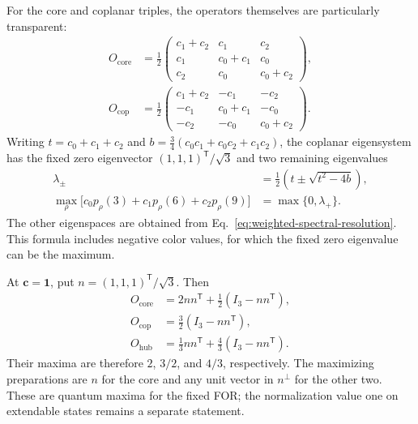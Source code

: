 \documentclass[aps,pra,reprint,superscriptaddress,longbibliography,nofootinbib,floatfix,10pt]{revtex4-2}
\theoremstyle{definition}\newtheorem{definition}[theorem]{Definition}
\theoremstyle{remark}\newtheorem{remark}[theorem]{Remark}
\begin{document}
For the core and coplanar triples, the operators themselves are particularly transparent:
\begin{equation}\label{eq:weighted-YO-operators}
\begin{aligned}
O_{\mathrm{core}}&=\frac12\begin{pmatrix}
c_1+c_2&c_1&c_2\\c_1&c_0+c_1&c_0\\c_2&c_0&c_0+c_2
\end{pmatrix},\\
O_{\mathrm{cop}}&=\frac12\begin{pmatrix}
c_1+c_2&-c_1&-c_2\\-c_1&c_0+c_1&-c_0\\-c_2&-c_0&c_0+c_2
\end{pmatrix}.
\end{aligned}
\end{equation}
Writing $t=c_0+c_1+c_2$ and $b=\tfrac34(c_0c_1+c_0c_2+c_1c_2)$, the coplanar eigensystem has the fixed zero eigenvector $(1,1,1)^{\mathsf T}/\sqrt3$ and two remaining eigenvalues
\begin{equation}\label{eq:weighted-coplanar-max}
\begin{aligned}
\lambda_\pm&=\tfrac12\left(t\pm\sqrt{t^2-4b}\right),\\
\max_\rho\bigl[c_0p_\rho(3)+c_1p_\rho(6)+c_2p_\rho(9)\bigr]
&=\max\{0,\lambda_+\}.
\end{aligned}
\end{equation}
The other eigenspaces are obtained from Eq.~\eqref{eq:weighted-spectral-resolution}. This formula includes negative color values, for which the fixed zero eigenvalue can be the maximum.

At $\mathbf c=\mathbf1$, put $n=(1,1,1)^{\mathsf T}/\sqrt3$. Then
\begin{equation}\label{eq:weighted-YO-unit-eigensystems}
\begin{aligned}
O_{\mathrm{core}}&=2nn^{\mathsf T}+\tfrac12(I_3-nn^{\mathsf T}),\\
O_{\mathrm{cop}}&=\tfrac32(I_3-nn^{\mathsf T}),\\
O_{\mathrm{hub}}&=\tfrac13nn^{\mathsf T}+\tfrac43(I_3-nn^{\mathsf T}).
\end{aligned}
\end{equation}
Their maxima are therefore $2$, $3/2$, and $4/3$, respectively. The maximizing preparations are $n$ for the core and any unit vector in $n^\perp$ for the other two. These are quantum maxima for the fixed FOR; the normalization value one on extendable states remains a separate statement.
\end{document}
